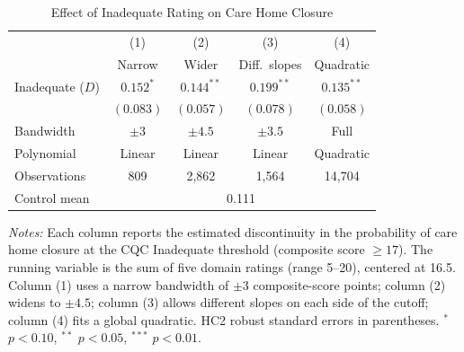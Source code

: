 \begin{table}[t]
\centering
\begin{threeparttable}
\caption{Effect of Inadequate Rating on Care Home Closure}
\label{tab:main}
\begin{tabular}{lcccc}
\toprule
 & (1) & (2) & (3) & (4) \\
 & Narrow & Wider & Diff.~slopes & Quadratic \\
\midrule
Inadequate ($D$) & $0.152^{*}$ & $0.144^{**}$ & $0.199^{**}$ & $0.135^{**}$ \\
 & $(0.083)$ & $(0.057)$ & $(0.078)$ & $(0.058)$ \\
\midrule
Bandwidth & $\pm 3$ & $\pm 4.5$ & $\pm 3.5$ & Full \\
Polynomial & Linear & Linear & Linear & Quadratic \\
Observations & 809 & 2,862 & 1,564 & 14,704 \\
Control mean & \multicolumn{4}{c}{0.111} \\
\bottomrule
\end{tabular}
\begin{tablenotes}[flushleft]
\small
\item \textit{Notes:} Each column reports the estimated discontinuity in the probability of care home closure at the CQC Inadequate threshold (composite score $\geq 17$). The running variable is the sum of five domain ratings (range 5--20), centered at 16.5. Column (1) uses a narrow bandwidth of $\pm 3$ composite-score points; column (2) widens to $\pm 4.5$; column (3) allows different slopes on each side of the cutoff; column (4) fits a global quadratic. HC2 robust standard errors in parentheses. $^{*}$ $p<0.10$, $^{**}$ $p<0.05$, $^{***}$ $p<0.01$.
\end{tablenotes}
\end{threeparttable}
\end{table}
